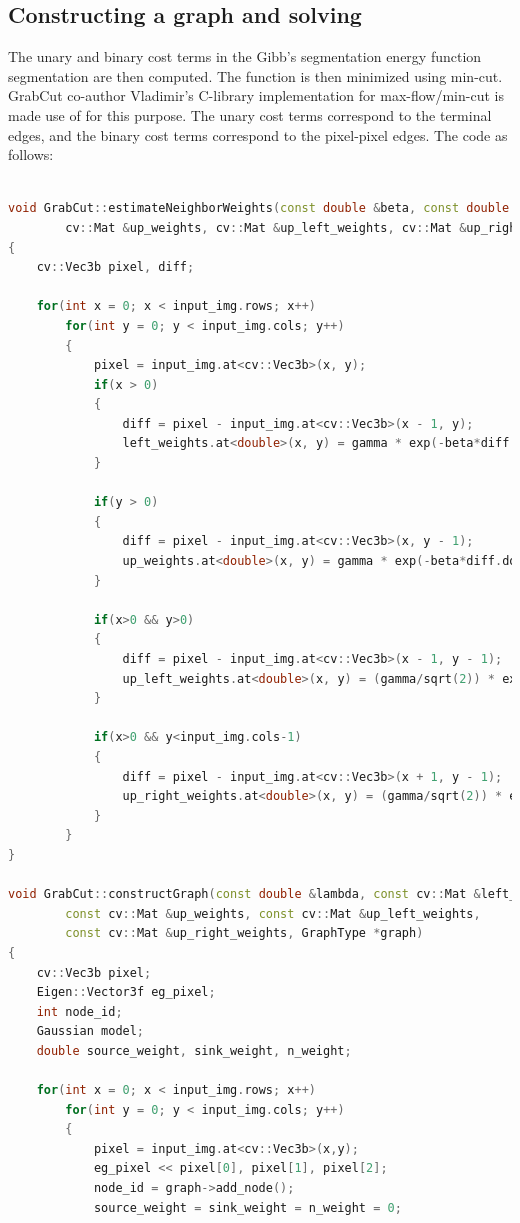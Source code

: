 \documentclass[a4paper,11]{article}
\begin{document}
  \subsection{Constructing a graph and solving}
  
    The unary and binary cost terms in the Gibb's segmentation energy function segmentation are then computed.  The function is then minimized using min-cut. GrabCut co-author Vladimir's C-library implementation for max-flow/min-cut is made use of for this purpose. The unary cost terms correspond to the terminal edges, and the binary cost terms correspond to the pixel-pixel edges. The code as follows:
    \begin{lstlisting}[language=C++]
    
void GrabCut::estimateNeighborWeights(const double &beta, const double &gamma, cv::Mat &left_weights,
		cv::Mat &up_weights, cv::Mat &up_left_weights, cv::Mat &up_right_weights)
{
	cv::Vec3b pixel, diff;

	for(int x = 0; x < input_img.rows; x++)
		for(int y = 0; y < input_img.cols; y++)
		{
			pixel = input_img.at<cv::Vec3b>(x, y);
			if(x > 0)
			{
				diff = pixel - input_img.at<cv::Vec3b>(x - 1, y);
				left_weights.at<double>(x, y) = gamma * exp(-beta*diff.dot(diff));
			}

			if(y > 0)
			{
				diff = pixel - input_img.at<cv::Vec3b>(x, y - 1);
				up_weights.at<double>(x, y) = gamma * exp(-beta*diff.dot(diff));
			}
			
			if(x>0 && y>0)
			{
				diff = pixel - input_img.at<cv::Vec3b>(x - 1, y - 1);
				up_left_weights.at<double>(x, y) = (gamma/sqrt(2)) * exp(-beta*diff.dot(diff));
			}

			if(x>0 && y<input_img.cols-1)
			{
				diff = pixel - input_img.at<cv::Vec3b>(x + 1, y - 1);
				up_right_weights.at<double>(x, y) = (gamma/sqrt(2)) * exp(-beta*diff.dot(diff));
			}
		}
}

void GrabCut::constructGraph(const double &lambda, const cv::Mat &left_weights,
		const cv::Mat &up_weights, const cv::Mat &up_left_weights,
		const cv::Mat &up_right_weights, GraphType *graph)
{
	cv::Vec3b pixel;
	Eigen::Vector3f eg_pixel;
	int node_id;
	Gaussian model;
	double source_weight, sink_weight, n_weight;

	for(int x = 0; x < input_img.rows; x++)
		for(int y = 0; y < input_img.cols; y++)
		{
			pixel = input_img.at<cv::Vec3b>(x,y);
			eg_pixel << pixel[0], pixel[1], pixel[2];
			node_id = graph->add_node();
			source_weight = sink_weight = n_weight = 0;


\end{lstlisting}
\end{document}

